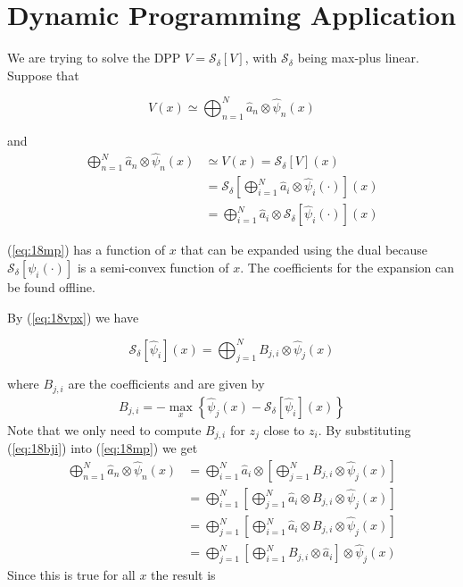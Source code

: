 \section{Dynamic Programming Application}
We are trying to solve the DPP $V=\mathcal{S}_\delta[V]$, with $\mathcal{S}_\delta$ being max-plus linear.
Suppose that

\begin{equation*}
V(x)\simeq \bigoplus_{n=1}^N\hat{a}_n\otimes\hat{\psi}_n(x)
\end{equation*}

and
\begin{align}
\label{eq:18mp}
\bigoplus_{n=1}^N\hat{a}_n\otimes\hat{\psi}_n(x) &\simeq V(x) = \mathcal{S}_\delta[V](x) \nonumber \\
&= \mathcal{S}_\delta\left[\bigoplus_{i=1}^N\hat{a}_i\otimes\hat{\psi}_i(\cdot)\right](x) \nonumber \\
&= \bigoplus_{i=1}^N\hat{a}_i\otimes\mathcal{S}_\delta[\hat{\psi}_i(\cdot)](x)
\end{align}

(\ref{eq:18mp}) has a function of $x$ that can be expanded using the dual because $\mathcal{S}_\delta[\psi_i(\cdot)]$ is a semi-convex function of $x$.
The coefficients for the expansion can be found offline.

By (\ref{eq:18vpx}) we have

\begin{equation*}
\mathcal{S}_\delta[\hat{\psi}_i](x) = \bigoplus_{j=1}^N B_{j,i}\otimes\hat{\psi}_j(x)
\end{equation*}

where $B_{j,i}$ are the coefficients and are given by
\begin{align}
\label{eq:18bji}
B_{j,i} = -\max_x\left\lbrace \hat{\psi}_j(x) - \mathcal{S}_\delta[\hat{\psi}_i](x) \right\rbrace
\end{align}
Note that we only need to compute $B_{j,i}$ for $z_j$ close to $z_i$.
By substituting (\ref{eq:18bji}) into (\ref{eq:18mp}) we get
\begin{align*}
\bigoplus_{n=1}^N\hat{a}_n\otimes\hat{\psi}_n(x) &= \bigoplus_{i=1}^N\hat{a}_i\otimes\left[ \bigoplus_{j=1}^N B_{j,i}\otimes\hat{\psi}_j(x)\right] \\
&= \bigoplus_{i=1}^N\left[\bigoplus_{j=1}^N\hat{a}_i\otimes B_{j,i}\otimes \hat{\psi}_j(x)\right] \\
&= \bigoplus_{j=1}^N\left[\bigoplus_{i=1}^N\hat{a}_i\otimes B_{j,i}\otimes \hat{\psi}_j(x)\right] \\
&= \bigoplus_{j=1}^N\left[\bigoplus_{i=1}^N B_{j,i}\otimes\hat{a}_i\right] \otimes \hat{\psi}_j(x)
\end{align*}
Since this is true for all $x$ the result is

